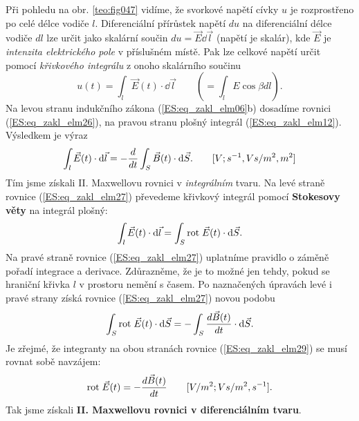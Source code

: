       Při pohledu na obr. \ref{teo:fig047} vidíme, že svorkové napětí cívky \(u\) je rozprostřeno po
      celé délce vodiče \(l\). Diferenciální přírůstek napětí \(du\) na diferenciální délce vodiče
      \(dl\) lze určit jako skalární součin \(du = \vec{E}\dd{\vec{l}}\) (napětí je skalár), kde
      \(\vec{E}\) je \emph{intenzita elektrického pole} v příslušném místě. Pak lze celkové napětí
      určit pomocí \emph{křivkového integrálu} z onoho skalárního součinu
      \begin{equation}\label{ES:eq_zakl_elm26}
        u(t) = \int_{l}\vec{E}(t)\cdot \dd{\vec{l}} \qquad (=\int_lE\cos\beta dl).
      \end{equation}
      Na levou stranu indukčního zákona (\ref{ES:eq_zakl_elm06}b) dosadíme rovnici
      (\ref{ES:eq_zakl_elm26}), na pravou stranu plošný integrál (\ref{ES:eq_zakl_elm12}). Výsledkem
      je výraz
      \begin{equation}\label{ES:eq_zakl_elm27}
        \int_{l}\vec{E}(t)\cdot \mathop{}\!\mathrm{d}\vec{l} = -\dfrac{d }{d t}\int_{S}\vec{B}(t)\cdot \mathop{}\!\mathrm{d}\vec{S}.
        \qquad [V;s^{-1},Vs/m^2,m^2]
      \end{equation}
      Tím jsme získali II. Maxwellovu rovnici v \emph{integrálním} tvaru. Na levé straně rovnice
      (\ref{ES:eq_zakl_elm27}) převedeme křivkový integrál pomocí \textbf{Stokesovy věty} na
      integrál plošný:
      \begin{equation}\label{ES:eq_zakl_elm28}
        \int_{l}\vec{E}(t)\cdot \mathop{}\!\mathrm{d}\vec{l} = \int_{S}\mathrm{rot}\;\vec{E}(t)\cdot \mathop{}\!\mathrm{d}\vec{S}.
      \end{equation}
      Na pravé straně rovnice (\ref{ES:eq_zakl_elm27}) uplatníme pravidlo o záměně pořadí integrace
      a derivace. Zdůrazněme, že je to možné jen tehdy, pokud se hraniční křivka \(l\) v prostoru
      nemění s časem. Po naznačených úpravách levé i pravé strany získá rovnice
      (\ref{ES:eq_zakl_elm27}) novou podobu
      \begin{equation}\label{ES:eq_zakl_elm29}
        \int_{S}\mathrm{rot}\;\vec{E}(t)\cdot \mathop{}\!\mathrm{d}\vec{S} = -\int_{S}\dfrac{d \vec{B}(t)}{d t}\cdot \mathop{}\!\mathrm{d}\vec{S}.
      \end{equation}
      Je zřejmé, že integranty na obou stranách rovnice (\ref{ES:eq_zakl_elm29}) se musí rovnat sobě
      navzájem:
      \begin{equation}\label{ES:eq_zakl_elm30}
        \mathrm{rot}\;\vec{E}(t) = -\dfrac{d \vec{B}(t)}{d t} \qquad [V/m^2;Vs/m^2,s^{-1}].
      \end{equation}
      Tak jsme získali \textbf{II. Maxwellovu rovnici v diferenciálním tvaru}.
      

